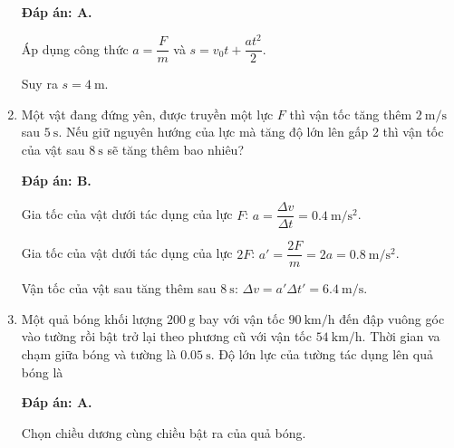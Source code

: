 \begin{enumerate}[label=\bfseries Câu \arabic*:]
	\loigiai
	{\textbf{Đáp án: A.}
		
		Áp dụng công thức $a=\dfrac{F}{m}$ và $s=v_0t+\dfrac{at^2}{2}$.
		
		Suy ra $s=\SI{4}{\meter}$.
		
		
	}
	\item {}
	
	\cauhoi
	{Một vật đang đứng yên, được truyền một lực $F$ thì vận tốc tăng thêm $\SI{2}{\meter / \second}$ sau $\SI{5}{\second}$. Nếu giữ nguyên hướng của lực mà tăng độ lớn lên gấp 2 thì vận tốc của vật sau $\SI{8}{\second}$ sẽ tăng thêm bao nhiêu?
	}
	
	\loigiai
	{\textbf{Đáp án: B.}
		
		Gia tốc của vật dưới tác dụng của lực $F$: $a=\dfrac{\Delta v}{\Delta t}=\SI{0.4}{\meter / \second \squared}$.
		
		Gia tốc của vật dưới tác dụng của lực $2F$: $a'=\dfrac{2F}{m}=2a=\SI{0.8}{\meter / \second \squared}$.
		
		Vận tốc của vật sau tăng thêm sau $\SI{8}{\second}$: $\Delta v= a' \Delta t'=\SI{6.4}{\meter / \second}$.
		
		
	}
	\item {}
	
	\cauhoi
	{Một quả bóng khối lượng $\SI{200}{\gram}$ bay với vận tốc $\SI{90}{\kilo\meter/\hour}$ đến đập vuông góc vào tường rồi bật trở lại theo phương cũ với vận tốc $\SI{54}{\kilo\meter/\hour}$. Thời gian va chạm giữa bóng và tường là $\SI{0,05}{\second}$. Độ lớn lực của tường tác dụng lên quả bóng là
	}
	
	\loigiai
	{\textbf{Đáp án: A.}
		
		Chọn chiều dương cùng chiều bật ra của quả bóng.
		
}
\end{enumerate}
